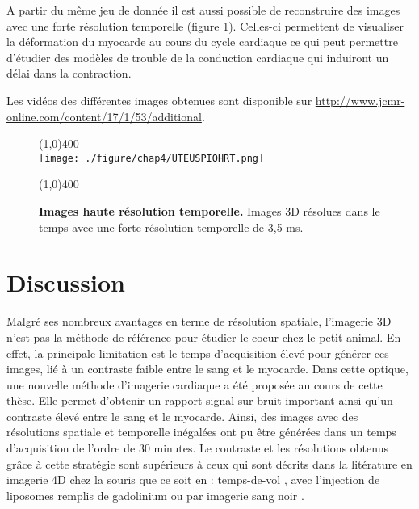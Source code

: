 A partir du même jeu de donnée il est aussi possible de reconstruire des images avec une forte résolution temporelle (figure \ref{fig:UTEUSPIOHRT}). Celles-ci permettent de visualiser la déformation du myocarde au cours du cycle cardiaque ce qui peut permettre d'étudier des modèles de trouble de la conduction cardiaque qui induiront un délai dans la contraction. 

Les vidéos des différentes images obtenues sont disponible sur \url{http://www.jcmr-online.com/content/17/1/53/additional}.

\begin{figure}[H]
\centering
\line(1,0){400} \\
\texttt{[image: ./figure/chap4/UTEUSPIOHRT.png]}
\caption[Images haute résolution temporelle.]{\label{fig:UTEUSPIOHRT} \textbf{Images haute résolution temporelle.} Images 3D résolues dans le temps avec une forte résolution temporelle de 3,5 ms.}
\line(1,0){400} \\ 
\end{figure}

\section{Discussion}

Malgré ses nombreux avantages en terme de résolution spatiale, l’imagerie 3D n’est pas la méthode de référence pour étudier le coeur chez le petit animal. En effet, la principale limitation est le temps d’acquisition élevé pour générer ces images, lié à un contraste faible entre le sang et le myocarde. Dans cette optique, une nouvelle méthode d’imagerie cardiaque a été proposée au cours de cette thèse. Elle permet d’obtenir un rapport signal-sur-bruit important ainsi qu’un contraste élevé entre le sang et le myocarde. Ainsi, des images avec des résolutions spatiale et temporelle inégalées ont pu être générées dans un temps d’acquisition de l’ordre de 30 minutes. Le contraste et les résolutions obtenus grâce à cette stratégie sont supérieurs à ceux qui sont décrits dans la litérature en imagerie 4D chez la souris que ce soit en : temps-de-vol \cite{Feintuch:2007aa}, avec l'injection de liposomes remplis de gadolinium \cite{Bucholz:2008uq,Bucholz:2010aa} ou par imagerie sang noir \cite{Miraux:2009rm}.

